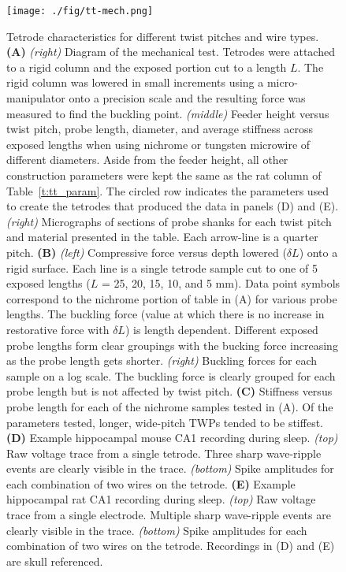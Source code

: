 \documentclass[11pt,a4paper]{article}
\begin{document}
\begin{figure}
\centering
\texttt{[image: ./fig/tt-mech.png]}
\caption{Tetrode characteristics for different twist pitches and wire types.
    \textbf{(A)} \textit{(right)} Diagram of the mechanical test. Tetrodes were
    attached to a rigid column and the exposed portion cut to a length $L$. The
    rigid column was lowered in small increments using a micro-manipulator onto
    a precision scale and the resulting force was measured to find the buckling
    point. \textit{(middle)} Feeder height versus twist pitch, probe length,
    diameter, and average stiffness across exposed lengths when using nichrome
    or tungsten microwire of different diameters. Aside from the feeder height,
    all other construction parameters were kept the same as the rat column of
    Table~\ref{t:tt_param}. The circled row indicates the parameters used to
    create the tetrodes that produced the data in panels (D) and (E).
    \textit{(right)} Micrographs of sections of probe shanks for each twist
    pitch and material presented in the table. Each arrow-line is a quarter
    pitch.
    \textbf{(B)} \textit{(left)} Compressive force versus depth lowered
    ($\delta L$) onto a rigid surface. Each line is a single tetrode sample cut
    to one of 5 exposed lengths ($L$ = 25, 20, 15, 10, and 5 mm). Data point
    symbols correspond to the nichrome portion of table in (A) for various
    probe lengths. The buckling force (value at which there is no increase in
    restorative force with $\delta L$) is length dependent. Different exposed
    probe lengths form clear groupings with the bucking force increasing as the
    probe length gets shorter. \textit{(right)} Buckling forces for each sample
    on a log scale.  The buckling force is clearly grouped for each probe
    length but is not affected by twist pitch.
    \textbf{(C)} Stiffness versus probe length for each of the nichrome samples
    tested in (A). Of the parameters tested, longer, wide-pitch TWPs tended to
    be stiffest.
    \textbf{(D)} Example hippocampal mouse CA1 recording during sleep.
    \textit{(top)} Raw voltage trace from a single tetrode. Three sharp
    wave-ripple events are clearly visible in the trace. \textit{(bottom)}
    Spike amplitudes for each combination of two wires on the tetrode.
    \textbf{(E)} Example hippocampal rat CA1 recording during sleep.
    \textit{(top)} Raw voltage trace from a single electrode. Multiple sharp
    wave-ripple events are clearly visible in the trace. \textit{(bottom)}
    Spike amplitudes for each combination of two wires on the tetrode.
    Recordings in (D) and (E) are skull referenced.
}

\label{f:trode_char}
\end{figure}
\end{document}
